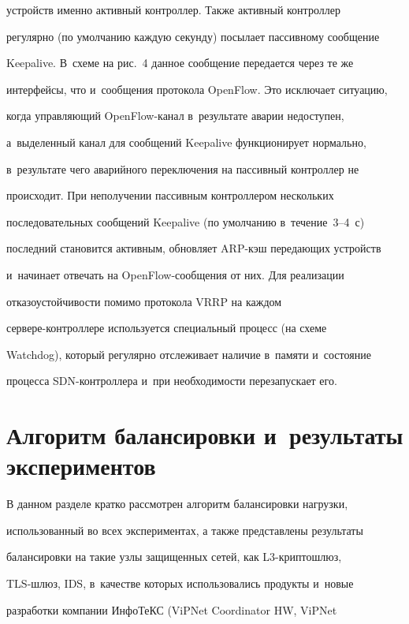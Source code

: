 устройств именно активный контроллер. Также активный контроллер 


регулярно (по умолчанию каждую секунду) посылает пассивному сообщение 


Keepalive. В~схеме на рис.~4 данное сообщение передается через те же 


интерфейсы, что и~сообщения протокола OpenFlow. Это исключает ситуацию, 


когда управляющий OpenFlow-ка\-нал в~результате аварии недоступен, 


а~выделенный канал для сообщений Keepalive функционирует нормально, 


в~результате чего аварийного переключения на пассивный контроллер не 


происходит. При неполучении пассивным контроллером нескольких 


последовательных сообщений Keepalive (по умолчанию в~течение~3--4~с) 


последний становится активным, обновляет ARP-кэш передающих устройств 


и~начинает отвечать на OpenFlow-со\-об\-ще\-ния от них. Для реализации 


отказоустойчивости помимо протокола VRRP на каждом  


сер\-ве\-ре-конт\-рол\-ле\-ре используется специальный процесс (на схеме 


Watchdog), который регулярно отслеживает наличие в~памяти и~состояние 


процесса SDN-конт\-рол\-ле\-ра и~при необходимости перезапускает его.





\section{Алгоритм балансировки и~результаты экспериментов}


  


  В данном разделе кратко рассмотрен алгоритм балансировки нагрузки, 


использованный во всех экспериментах, а также представлены результаты 


балансировки на такие узлы защищенных сетей, как L3-крип\-то\-шлюз,  


TLS-шлюз, IDS, в~качестве которых использовались продукты и~новые 


разработки компании ИнфоТеКС (ViPNet Coordinator HW, ViPNet  


